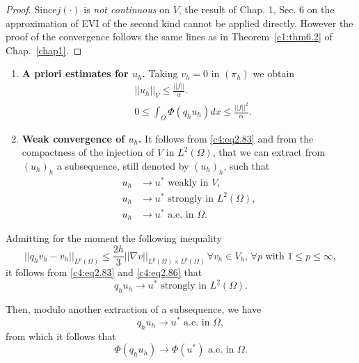 \begin{proof}%
Since\pageoriginale  $j(\cdot)$ is {\em not continuous} on $V$, the result of Chap. 1, 
Sec. 6 on the approximation of EVI of the second kind cannot be applied 
directly. However the proof of the convergence follows the same lines 
as in Theorem~\ref{c1:thm6.2} of Chap.~\ref{chap1}.
\end{proof}
\begin{enumerate}[(1)]
\item {\bf A priori estimates for $u_h$.} Taking $v_h = 0$ in $(\pi_h)$ we obtain 
\begin{align}
& ||u_h||_V \leq \frac{|| f ||}{\alpha}. \tag{2.83}\label{c4:eq2.83}\\
& 0 \leq \int_\Omega \Phi (q_h u_h) dx \leq \frac{||f||^2} {\alpha}. \tag{2.84}\label{c4:eq2.84}
\end{align}

\item {\bf Weak convergence of $u_h$.} It follows from \eqref{c4:eq2.83} and from the compactness of the injection of $V$ in $L^2(\Omega)$, that we can extract from $(u_h)_h$ a subsequence, still denoted by $(u_h)_h$, such that 
\begin{align}
u_h & \to u^* \text{ weakly in }V, \tag{2.85}\label{c4:eq2.85}\\
u_h & \to u^* \text{ strongly in } L^2 (\Omega), \tag{2.86}\label{c4:eq2.86}\\
u_h & \to u^* \text{ a.e. in }\Omega. \tag{2.87}\label{c4:eq2.87}
\end{align}
\end{enumerate}

Admitting for the moment the following inequality
\begin{equation}
||q_h v_h - v_h||_{L^p(\Omega)} \leq \frac{2h}{3} ||\nabla v||_{L^p(\Omega) \times L^p(\Omega)}\, \forall v_h \in V_h,\, \forall p \text{ with } 1 \leq p \leq \infty, \tag{2.88}\label{c4:eq2.88}
\end{equation}
it follows from \eqref{c4:eq2.83} and \eqref{c4:eq2.86} that 
\begin{equation}
q_h u_h \to u^* \text{ strongly in }L^2(\Omega). \tag{2.89}\label{c4:eq2.89}
\end{equation}

Then, modulo another extraction of a subsequence, we have
\begin{equation}
q_h u_h \to u^* \text{ a.e. in }\Omega, \tag{2.90}\label{c4:eq2.90}
\end{equation}
from which it follows that 
\begin{equation}
\Phi (q_h u_h) \to \Phi (u^*) \text{ a.e. in } \Omega. \tag{2.91}\label{c4:eq2.91}
\end{equation}

